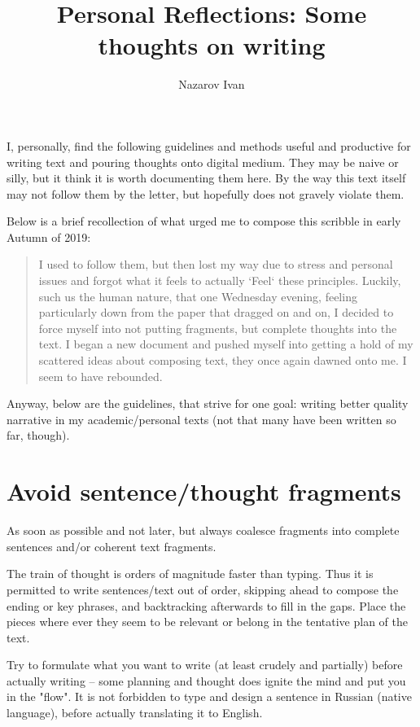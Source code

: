 \documentclass[10pt,a4paper,twocolumn]{article}
\title{Personal Reflections: Some thoughts on writing}
\author{Nazarov Ivan}
\begin{document}
\maketitle

I, personally, find the following guidelines and methods useful and productive for
writing text and pouring thoughts onto digital medium. They may be naive or silly, but
it think it is worth documenting them here. By the way this text itself may not follow
them by the letter, but hopefully does not gravely violate them.

Below is a brief recollection of what urged me to compose this scribble in early
Autumn of 2019:
\begin{quote}
  I used to follow them, but then lost my way due to stress and personal issues and
  forgot what it feels to actually `Feel` these principles. Luckily, such us the human
  nature, that one Wednesday evening, feeling particularly down from the paper that
  dragged on and on, I decided to force myself into not putting fragments, but complete
  thoughts into the text. I began a new document and pushed myself into getting a hold
  of my scattered ideas about composing text, they once again dawned onto me. I seem
  to have rebounded.
\end{quote}

Anyway, below are the guidelines, that strive for one goal: writing better quality
narrative in my academic/personal texts (not that many have been written so far, though).

\section{Avoid sentence/thought fragments} %
\label{sec:avoid_sentence_thought_fragments}

As soon as possible and not later, but always coalesce fragments into complete sentences
and/or coherent text fragments.

The train of thought is orders of magnitude faster than typing. Thus it is permitted
to write sentences/text out of order, skipping ahead to compose the ending or key phrases,
and backtracking afterwards to fill in the gaps. Place the pieces where ever they seem
to be relevant or belong in the tentative plan of the text.

Try to formulate what you want to write (at least crudely and partially) before actually
writing -- some planning and thought does ignite the mind and put you in the "flow".
It is not forbidden to type and design a sentence in Russian (native language), before
actually translating it to English.
\end{document}
